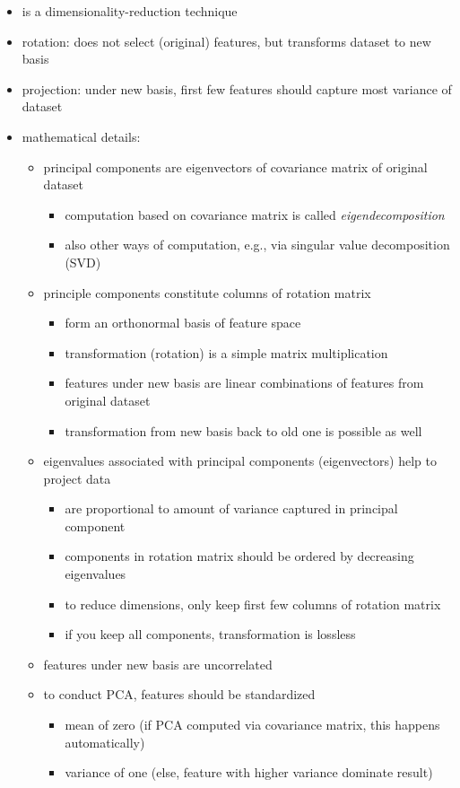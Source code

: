 \documentclass[12pt]{article}
\begin{document}
\begin{itemize}[left=0pt, nosep]
	\item is a dimensionality-reduction technique
	\item rotation: does not select (original) features, but transforms dataset to new basis
	\item projection: under new basis, first few features should capture most variance of dataset
	\item mathematical details:
	\begin{itemize}[left=0pt, nosep]
		\item principal components are eigenvectors of covariance matrix of original dataset
		\begin{itemize}[left=0pt, nosep]
			\item computation based on covariance matrix is called \emph{eigendecomposition}
			\item also other ways of computation, e.g., via singular value decomposition (SVD)
		\end{itemize}
		\item principle components constitute columns of rotation matrix
		\begin{itemize}[left=0pt, nosep]
			\item form an orthonormal basis of feature space
			\item transformation (rotation) is a simple matrix multiplication
			\item features under new basis are linear combinations of features from original dataset
			\item transformation from new basis back to old one is possible as well
		\end{itemize}
		\item eigenvalues associated with principal components (eigenvectors) help to project data
		\begin{itemize}[left=0pt, nosep]
			\item are proportional to amount of variance captured in principal component
			\item components in rotation matrix should be ordered by decreasing eigenvalues
			\item to reduce dimensions, only keep first few columns of rotation matrix
			\item if you keep all components, transformation is lossless
		\end{itemize}
		\item features under new basis are uncorrelated
		\item to conduct PCA, features should be standardized
		\begin{itemize}[left=0pt, nosep]
			\item mean of zero (if PCA computed via covariance matrix, this happens automatically)
			\item variance of one (else, feature with higher variance dominate result)
		\end{itemize}
	\end{itemize}
\end{itemize}
\end{document}
